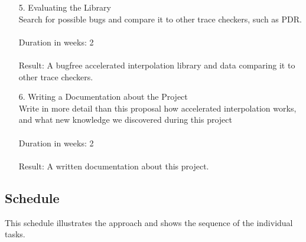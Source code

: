 \documentclass{article}
\begin{document}
\begin{itemize}
	\item[5.] Evaluating the Library \\
	Search for possible bugs and compare it to other trace checkers, such as PDR. \\\\
	Duration in weeks: 2 \\\\
	Result: A bugfree accelerated interpolation library and data comparing it to other trace checkers.
	
	\item[6.] Writing a Documentation about the Project \\
	Write in more detail than this proposal how accelerated interpolation works, and what new knowledge we discovered during this project \\\\
	Duration in weeks: 2 \\\\
	Result: A written documentation about this project.
\end{itemize}
\begin{landscape}
	\section{Schedule}
	This schedule illustrates the approach and shows the sequence of the individual tasks. \\ \\
	\hspace*{-4cm}
	
\end{landscape}
\pagebreak
{}



	
\end{document}

